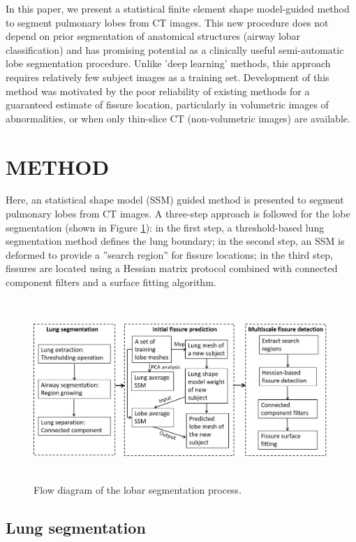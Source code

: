 \documentclass[]{spie}  %
\begin{document}
In this paper, we present a statistical finite element shape model-guided method to segment pulmonary lobes from CT images. This new procedure does not depend on prior segmentation of anatomical structures (airway lobar classification) and has promising potential as a clinically useful semi-automatic lobe segmentation procedure. Unlike 'deep learning' methods, this approach requires relatively few subject images as a training set. Development of this method was motivated by the poor reliability of existing methods for a guaranteed estimate of fissure location, particularly in volumetric images of abnormalities, or when only thin-slice CT (non-volumetric images) are available.

\section{METHOD}

Here, an statistical shape model (SSM) guided method is presented to segment pulmonary lobes from CT images. A three-step approach is followed for the lobe segmentation (shown in Figure \ref{fig:WholeWorkflow}): in the first step, a threshold-based lung segmentation method defines the lung boundary; in the second step, an SSM is deformed to provide a ''search region'' for fissure locations; in the third step, fissures are located using a Hessian matrix protocol combined with connected component filters and a surface fitting algorithm. 

\begin{figure}[htbp]
  \centering 
  \includegraphics[height=2.7in]{Image/WholeWorkflow.jpg}
  \caption{Flow diagram of the lobar segmentation process.}
  \label{fig:WholeWorkflow}
\end{figure}

\subsection{Lung segmentation}
\label{LungSegmentation}
\end{document}
